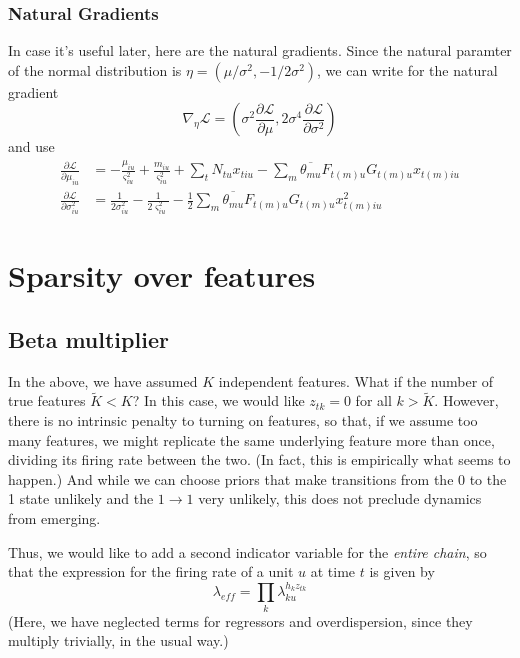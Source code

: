 \documentclass[11pt]{article}
\begin{document}
\subsubsection{Natural Gradients}
In case it's useful later, here are the natural gradients. Since the natural paramter of the normal distribution is $\eta = (\mu/\sigma^2, -1/2\sigma^2)$, we can write for the natural gradient
\begin{equation}
    \nabla_\eta \mathcal{L} = \left( \sigma^2 \frac{\partial \mathcal{L}}{\partial \mu}, 2\sigma^4 \frac{\partial \mathcal{L}}{\partial \sigma^2}\right)
\end{equation}
and use
\begin{align}
    \frac{\partial \mathcal{L}}{\partial \mu_{iu}} &= 
    -\frac{\mu_{iu}}{\varsigma^2_{iu}} + \frac{m_{iu}}{\varsigma^2_{iu}} + \sum_t N_{tu} x_{tiu} - \sum_{m} \overline{\theta_{mu}} F_{t(m)u} G_{t(m)u} x_{t(m)iu} \\
    \frac{\partial \mathcal{L}}{\partial \sigma^2_{iu}} &= 
    \frac{1}{2\sigma^2_{iu}} - \frac{1}{2\varsigma^2_{iu}} - \frac{1}{2} \sum_{m} \overline{\theta_{mu}} F_{t(m)u} G_{t(m)u} x^2_{t(m)iu}
\end{align}

\section{Sparsity over features}
\subsection{Beta multiplier}
In the above, we have assumed $K$ independent features. What if the number of true features $\tilde{K} < K$? In this case, we would like $z_{tk} = 0$ for all $k > \tilde{K}$. However, there is no intrinsic penalty to turning on features, so that, if we assume too many features, we might replicate the same underlying feature more than once, dividing its firing rate between the two. (In fact, this is empirically what seems to happen.) And while we can choose priors that make transitions from the 0 to the 1 state unlikely and the $1 \rightarrow 1$ very unlikely, this does not preclude dynamics from emerging.

Thus, we would like to add a second indicator variable for the \emph{entire chain}, so that the expression for the firing rate of a unit $u$ at time $t$ is given by 
\begin{equation}
    \lambda_{eff} = \prod_{k} \lambda_{ku}^{h_k z_{tk}}
\end{equation}
(Here, we have neglected terms for regressors and overdispersion, since they multiply trivially, in the usual way.)
\end{document}
